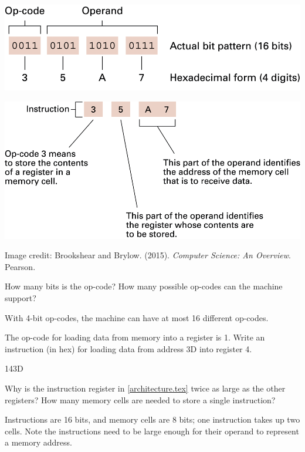 
\begin{multicols}{2}
\includegraphics[width=\linewidth]{opcode1.png}

\columnbreak

\includegraphics[width=\linewidth]{opcode2.png}
\end{multicols}

\begin{center}
\color{gray}\scriptsize Image credit:
Brookshear and Brylow. (2015). \textit{Computer Science: An Overview}. Pearson.
\end{center}




\Q How many bits is the op-code? How many possible op-codes can the machine support?

\begin{answer}[3em]
With 4-bit op-codes, the machine can have at most 16 different op-codes.
\end{answer}


\Q The op-code for loading data from memory into a register is 1.
Write an instruction (in hex) for loading data from address 3D into register 4.

\begin{answer}[2em]
143D
\end{answer}


\Q Why is the instruction register in \ref{architecture.tex} twice as large as the other registers?
How many memory cells are needed to store a single instruction?

\begin{answer}
Instructions are 16 bits, and memory cells are 8 bits; one instruction takes up two cells.
Note the instructions need to be large enough for their operand to represent a memory address.
\end{answer}
